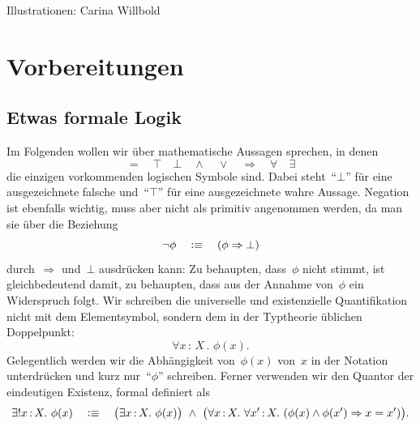 \documentclass[a4paper,ngerman,12pt]{scrartcl}
\theoremstyle{definition}
\theoremstyle{plain}
\theoremstyle{remark}
\renewcommand{\_}{\mathpunct{.}\,}
\newcommand{\?}{\,{:}\,}
\begin{document}
Illustrationen: Carina Willbold

\tableofcontents

\newpage

\section{Vorbereitungen}

\subsection{Etwas formale Logik}

Im Folgenden wollen wir über mathematische Aussagen sprechen, in denen
\[ {=} \quad {\top} \quad {\bot} \quad {\wedge} \quad {\vee} \quad {\Rightarrow} \quad {\forall} \quad {\exists} \]
die einzigen vorkommenden logischen Symbole sind. Dabei steht~"`$\bot$"' für
eine ausgezeichnete falsche und~"`$\top$"' für eine ausgezeichnete wahre Aussage.
Negation ist ebenfalls wichtig, muss aber nicht als primitiv
angenommen werden, da man sie über die Beziehung
\[ \neg\phi \quad\vcentcolon\equiv\quad (\phi \Rightarrow \bot) \]
durch~$\Rightarrow$ und~$\bot$ ausdrücken kann: Zu behaupten, dass~$\phi$ nicht
stimmt, ist gleichbedeutend damit, zu behaupten, dass aus der Annahme
von~$\phi$ ein Widerspruch folgt.
Wir schreiben die universelle und existenzielle Quantifikation nicht mit dem
Elementsymbol, sondern dem in der Typtheorie üblichen Doppelpunkt:
\[ \forall x\?X\_ \phi(x). \]
Gelegentlich werden wir die Abhängigkeit von~$\phi(x)$ von~$x$ in der Notation
unterdrücken und kurz nur~"`$\phi$"' schreiben. Ferner verwenden wir den
Quantor der eindeutigen Existenz, formal definiert als
\[ \exists! x\?X\_ \phi(x) \quad\vcentcolon\equiv\quad
  \bigl(\exists x\?X\_ \phi(x)\bigr) \ \wedge\ \bigl(\forall x\?X\_ \forall x'\?X\_
  (\phi(x) \wedge \phi(x') \Rightarrow x = x')\bigr). \]
\end{document}
